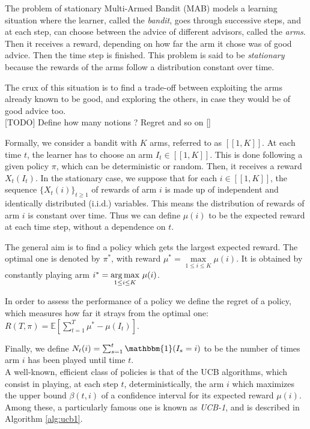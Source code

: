 The problem of stationary Multi-Armed Bandit (MAB) models a learning situation where the learner, called the \textit{bandit}, goes through successive steps, and at each step, can choose between the advice of different advisors, called the \textit{arms}. Then it receives a reward, depending on how far the arm it chose was of good advice. Then the time step is finished. This problem is said to be \textit{stationary} because the rewards of the arms follow a distribution constant over time.

The crux of this situation is to find a trade-off between exploiting the arms already known to be good, and exploring the others, in case they would be of good advice too.\\

[TODO] Define how many notions ? Regret and so on []

Formally, we consider a bandit with $K$ arms, referred to as $[\![1,K]\!]$. At each time $t$, the learner has to choose an arm $I_t \in [\![1,K]\!]$. This is done following a given policy $\pi$, which can be deterministic or random. Then, it receives a reward $X_t(I_t)$. In the stationary case, we suppose that for each $i \in [\![1,K]\!]$, the sequence $\{X_t(i)\}_{t \geq 1}$ of rewards of arm $i$ is made up of independent and identically distributed (i.i.d.) variables. This means the distribution of rewards of arm $i$ is constant over time. Thus we can define $\mu(i)$ to be the expected reward at each time step, without a dependence on $t$.

The general aim is to find a policy which gets the largest expected reward. The optimal one is denoted by $\pi^*$, with reward $\mu^*=\underset{1\leq i \leq K}{\max} \mu(i)$. It is obtained by constantly playing arm $i^* = \underset{1\leq i \leq K}{\operatorname*{arg\,max}}\ \mu(i)$.

In order to assess the performance of a policy we define the regret of a policy, which measures how far it strays from the optimal one: $R(T,\pi)=\mathbb{E}\left[\sum_{t=1}^T \mu^* - \mu(I_t) \right]$.

Finally, we define $N_t(i)=\sum_{s=1}^t \mathbbm{1}(I_s=i)$ to be the number of times arm $i$ has been played until time $t$.\\

A well-known, efficient class of policies is that of the UCB	algorithms, which consist in playing, at each step $t$, deterministically, the arm $i$ which maximizes the upper bound $\beta(t,i)$ of a confidence interval for its expected reward $\mu(i)$.
Among these, a particularly famous one is known as \textit{UCB-1}, and is described in Algorithm \ref{alg:ucb1}.

